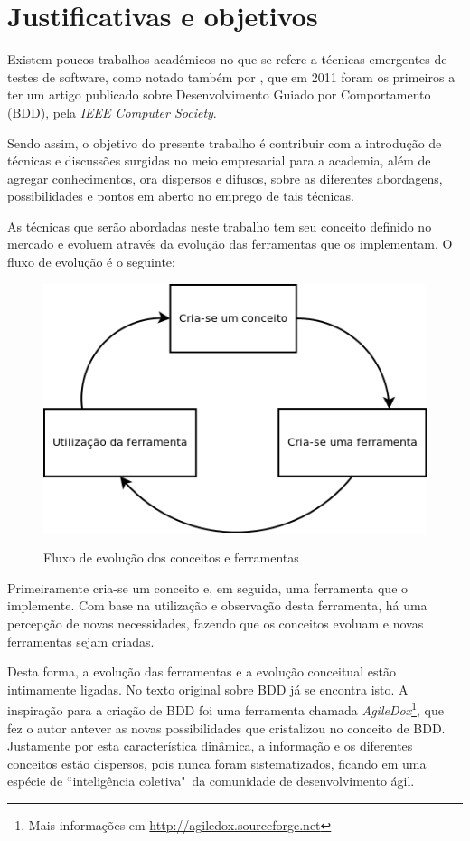 \section{Justificativas e objetivos}

Existem poucos trabalhos acadêmicos no que se refere a técnicas emergentes de testes de software, como notado também por , que em 2011 foram os primeiros a ter um artigo publicado sobre Desenvolvimento Guiado por Comportamento (BDD), pela \textit{IEEE Computer Society}.

Sendo assim, o objetivo do presente trabalho é contribuir com a introdução de técnicas e discussões surgidas no meio empresarial para a academia, além de agregar conhecimentos, ora dispersos e difusos, sobre as diferentes abordagens, possibilidades e pontos em aberto no emprego de tais técnicas.

As técnicas que serão abordadas neste trabalho tem seu conceito definido no mercado e evoluem através da evolução das ferramentas que os implementam. O fluxo de evolução é o seguinte:

\begin{figure}[h]
  \center
  \caption{Fluxo de evolução dos conceitos e ferramentas}
  \includegraphics[scale=0.60]{images/fluxo-conceito-ferramenta}
  \label{img:fluxo_conceito_ferramenta}
\end{figure}

Primeiramente cria-se um conceito e, em seguida, uma ferramenta que o implemente. Com base na utilização e observação desta ferramenta, há uma percepção de novas necessidades, fazendo que os conceitos evoluam e novas ferramentas sejam criadas.

Desta forma, a evolução das ferramentas e a evolução conceitual estão intimamente ligadas. No texto original sobre BDD \cite{IntroducingBDD} já se encontra isto. A inspiração para a criação de BDD foi uma ferramenta chamada \textit{AgileDox}\footnote{Mais informações em \url{http://agiledox.sourceforge.net}}, que fez o autor antever as novas possibilidades que cristalizou no conceito de BDD. Justamente por esta característica dinâmica, a informação e os diferentes conceitos estão dispersos, pois nunca foram sistematizados, ficando em uma espécie de ``inteligência coletiva"\ da comunidade de desenvolvimento ágil.

